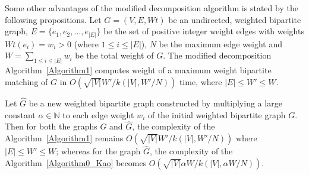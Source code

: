 \documentclass[runningheads,a4paper]{llncs}
\begin{document}
Some other advantages of the modified decomposition algorithm is stated by the following propositions. 
Let $G = (V, E, \textit{Wt})$ be an undirected, weighted bipartite graph, $E=\{e_1,e_2,\ldots,e_{|E|}\}$ be the set of positive integer weight
edges with weights $\textit{Wt}(e_i)=w_i >0$ (where $1 \leq i \leq |E|$), $N$ be the maximum edge weight and
 $W=\sum_{1 \leq i \leq |E|} w_i $ be the total weight of  $G$.
The modified decomposition Algorithm~\ref{Algorithm1} computes weight of a maximum weight bipartite  matching  of $G$ in 
 $O(\sqrt{|V|}W'/k(|V|,W'/{N}))$ time, where $|E| \leq W' \leq W$.
\begin{proposition}
\label{Lm:M_Incremental Wt}
Let $\widehat{G}$  be a new weighted bipartite graph constructed by multiplying a large constant $\alpha \in \mathbb{N} $ to each edge weight $w_i$ 
of the initial weighted bipartite graph $G$. 
Then  for both the graphs $G$ and $\widehat{G}$, the complexity of the Algorithm~\ref{Algorithm1} remains  $O(\sqrt{|V|}W'/k(|V|,W'/{N}))$ where $|E| \leq W' \leq W$; whereas for the graph $\widehat{G}$, the complexity of the Algorithm~\ref{Algorithm0_Kao} becomes $O(\sqrt{|V|}\alpha W/k(|V|,\alpha W/{N}))$.
\end{proposition}
\end{document}
